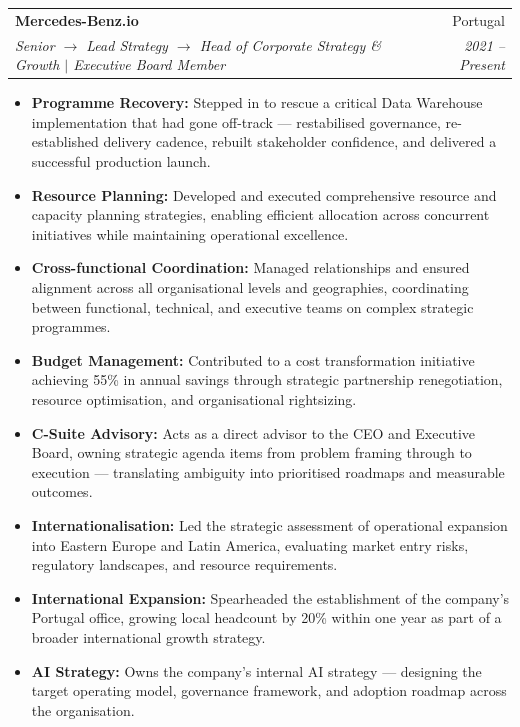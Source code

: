 \documentclass[a4paper,10pt]{article}
\makeatletter
\newcommand{\resumeItem}[1]{
  \item\small{
    {#1 \vspace{-2pt}}
  }
}
\newcommand{\resumeSubheading}[4]{
  \vspace{-2pt}\item
    \begin{tabular*}{0.97\textwidth}[t]{l@{\extracolsep{\fill}}r}
      \textbf{#1} & #2 \\
      \textit{\small#3} & \textit{\small #4} \\
    \end{tabular*}\vspace{-3pt}
}
\newcommand{\resumeItemListStart}{\begin{itemize}[leftmargin=0.2in, itemsep=2pt, parsep=0pt, topsep=2pt]}
\newcommand{\resumeItemListEnd}{\end{itemize}\vspace{-4pt}}
\makeatother
\begin{document}
    \resumeSubheading
      {Mercedes-Benz.io}{Portugal}
      {Senior $\rightarrow$ Lead Strategy $\rightarrow$ Head of Corporate Strategy \& Growth $|$ Executive Board Member}{2021 -- Present}
      \resumeItemListStart
        \resumeItem{\textbf{Programme Recovery:} Stepped in to rescue a critical Data Warehouse implementation that had gone off-track — restabilised governance, re-established delivery cadence, rebuilt stakeholder confidence, and delivered a successful production launch.}
        \resumeItem{\textbf{Resource Planning:} Developed and executed comprehensive resource and capacity planning strategies, enabling efficient allocation across concurrent initiatives while maintaining operational excellence.}
        \resumeItem{\textbf{Cross-functional Coordination:} Managed relationships and ensured alignment across all organisational levels and geographies, coordinating between functional, technical, and executive teams on complex strategic programmes.}
        \resumeItem{\textbf{Budget Management:} Contributed to a cost transformation initiative achieving 55\% in annual savings through strategic partnership renegotiation, resource optimisation, and organisational rightsizing.}
        \resumeItem{\textbf{C-Suite Advisory:} Acts as a direct advisor to the CEO and Executive Board, owning strategic agenda items from problem framing through to execution — translating ambiguity into prioritised roadmaps and measurable outcomes.}
        \resumeItem{\textbf{Internationalisation:} Led the strategic assessment of operational expansion into Eastern Europe and Latin America, evaluating market entry risks, regulatory landscapes, and resource requirements.}
        \resumeItem{\textbf{International Expansion:} Spearheaded the establishment of the company's Portugal office, growing local headcount by 20\% within one year as part of a broader international growth strategy.}
        \resumeItem{\textbf{AI Strategy:} Owns the company's internal AI strategy — designing the target operating model, governance framework, and adoption roadmap across the organisation.}
      \resumeItemListEnd
\end{document}
